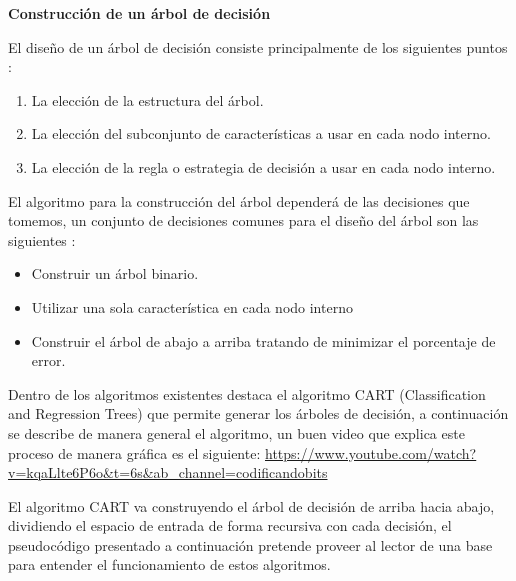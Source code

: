 \documentclass[11pt,fleqn]{book} %
\begin{document}
\textbf{Construcción de un árbol de decisión}

El diseño de un árbol de decisión consiste principalmente de los siguientes puntos \cite{dtc_survey}:

\begin{enumerate}
\item La elección de la estructura del árbol.
\item La elección del subconjunto de características a usar en cada nodo interno.
\item La elección de la regla o estrategia de decisión a usar en cada nodo interno. 
\end{enumerate}

El algoritmo para la construcción del árbol dependerá de las decisiones que tomemos, un conjunto de decisiones comunes para el diseño del árbol son las siguientes \cite{dtc_survey}:

\begin{itemize}
\item Construir un árbol binario.
\item Utilizar una sola característica en cada nodo interno
\item Construir el árbol de abajo a arriba tratando de minimizar el porcentaje de error. 
\end{itemize}

Dentro de los algoritmos existentes destaca el algoritmo CART (Classification and Regression Trees) que permite generar los árboles de decisión, a continuación se describe de manera general el algoritmo, un buen video que explica este proceso de manera gráfica es el siguiente: \url{https://www.youtube.com/watch?v=kqaLlte6P6o&t=6s&ab_channel=codificandobits}

El algoritmo CART va construyendo el árbol de decisión de arriba hacia abajo, dividiendo el espacio de entrada de forma recursiva con cada decisión, el pseudocódigo presentado a continuación pretende proveer al lector de una base para entender el funcionamiento de estos algoritmos.
\end{document}
